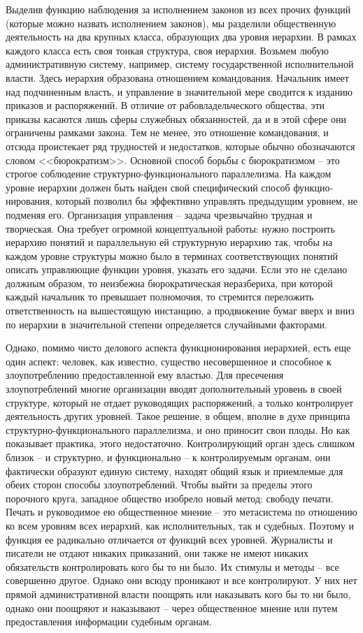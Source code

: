 \documentclass{book}
\begin{document}
Выделив функцию наблюдения за исполнением законов из всех прочих функций (которые можно назвать исполнением законов), мы разделили общественную деятельность на два крупных класса, образующих два уровня иерархии. В рамках каждого класса есть своя тонкая структура, своя иерархия. Возьмем любую административную систему, например, си­стему государственной исполнительной власти. Здесь иерархия образована отношением командования. Начальник имеет над подчиненным власть, и управление в значительной мере сво­дится к изданию приказов и распоряжений. В отличие от рабо­владельческого общества, эти приказы касаются лишь сферы служебных обязанностей, да и в этой сфере они ограничены рамками закона. Тем не менее, это отношение командования, и отсюда проистекает ряд трудностей и недостатков, которые обычно обозначаются словом <<бюрократизм>>. Основной способ борьбы с бюрократизмом -- это строгое соблюдение структур­но-функционального параллелизма. На каждом уровне иерар­хии должен быть найден свой специфический способ 
функцио­нирования, который позволил бы эффективно управлять преды­дущим уровнем, не подменяя его. Организация управления -- задача чрезвычайно трудная и творческая. Она требует огром­ной концептуальной работы: нужно построить иерархию поня­тий и параллельную ей структурную иерархию так, чтобы на каждом уровне структуры можно было в терминах соответствующих понятий описать управляющие функции уровня, ука­зать его задачи. Если это не сделано должным образом, то неиз­бежна бюрократическая неразбериха, при которой каждый на­чальник то превышает полномочия, то стремится переложить ответственность на вышестоящую инстанцию, а продвижение бумаг вверх и вниз по иерархии в значительной степени опре­деляется случайными факторами.

Однако, помимо чисто делового аспекта функционирования иерархией, есть еще один аспект: человек, как известно, сущест­во несовершенное и способное к злоупотреблению предостав­ленной ему властью. Для пресечения злоупотреблений многие организации вводят дополнительный уровень в своей структу­ре, который не отдает руководящих распоряжений, а только контролирует деятельность других уровней. Такое решение, в общем, вполне в духе принципа структурно-функционально­го параллелизма, и оно приносит свои плоды. Но как показы­вает практика, этого недостаточно. Контролирующий орган здесь слишком близок -- и структурно, и функционально -- к контролируемым органам, они фактически образуют единую систему, находят общий язык и приемлемые для обеих сто­рон способы злоупотреблений. Чтобы выйти за пределы этого порочного круга, западное общество изобрело новый метод: свободу печати. Печать и руководимое ею общественное мнение -- это метасистема  по отношению ко всем уровням всех иерархий, как исполнительных, так и судебных. 
Поэтому и функция ее радикально отличается от функций всех уровней. Журналисты и писатели не отдают никаких приказаний, они также не имеют никаких обязательств контролировать кого бы то ни было. Их стимулы и методы -- все совершенно другое. Однако они всюду проникают и все контролируют. У них нет прямой административной власти поощрять или наказывать кого бы то ни было, однако они поощряют и наказывают -- че­рез общественное мнение или путем предоставления информа­ции судебным органам.
\end{document}
